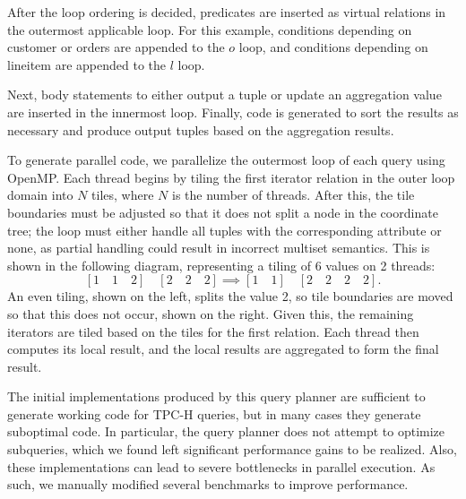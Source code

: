 \documentclass[acmsmall,screen,nonacm]{acmart}\settopmatter{printfolios=true,printccs=false,printacmref=false}
\begin{document}
After the loop ordering is decided, predicates are inserted as virtual relations in the outermost applicable loop. For this example, conditions depending on \textrm{customer} or \textrm{orders} are appended to the $o$ loop, and conditions depending on \textrm{lineitem} are appended to the $l$ loop.

Next, body statements to either output a tuple or update an aggregation value are inserted in the innermost loop. Finally, code is generated to sort the results as necessary and produce output tuples based on the aggregation results.

To generate parallel code, we parallelize the outermost loop of each query using OpenMP. Each thread begins by tiling the first iterator relation in the outer loop domain into $N$ tiles, where $N$ is the number of threads. After this, the tile boundaries must be adjusted so that it does not split a node in the coordinate tree; the loop must either handle all tuples with the corresponding attribute or none, as partial handling could result in incorrect multiset semantics. This is shown in the following diagram, representing a tiling of 6 values on 2 threads:
\[ [1\quad1\quad2]\quad[2\quad2\quad2] \implies [1\quad1]\quad[2\quad2\quad2\quad2]. \]
An even tiling, shown on the left, splits the value 2, so tile boundaries are moved so that this does not occur, shown on the right. Given this, the remaining iterators are tiled based on the tiles for the first relation. Each thread then computes its local result, and the local results are aggregated to form the final result.

The initial implementations produced by this query planner are sufficient to generate working code for TPC-H queries, but in many cases they generate suboptimal code. In particular, the query planner does not attempt to optimize subqueries, which we found left significant performance gains to be realized. Also, these implementations can lead to severe bottlenecks in parallel execution. As such, we manually modified several benchmarks to improve performance.
\end{document}
